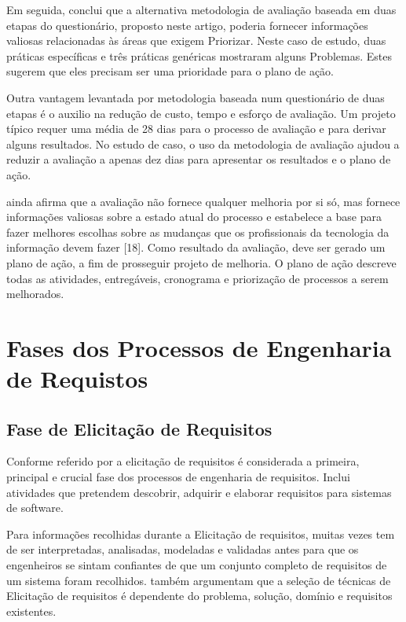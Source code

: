 Em seguida, \cite{cuevas2004assessment} conclui que a alternativa
metodologia de avaliação baseada em duas etapas do
questionário, proposto neste artigo, poderia fornecer
informações valiosas relacionadas às áreas que exigem
Priorizar. Neste caso de estudo, duas práticas específicas
e três práticas genéricas mostraram alguns
Problemas. Estes sugerem que eles precisam ser uma prioridade
para o plano de ação.

Outra vantagem levantada por \cite{cuevas2004assessment}
metodologia baseada num questionário de duas etapas é
o auxilio na redução de custo, tempo e esforço de avaliação. Um projeto típico requer uma média
de 28 dias para o processo de avaliação e para derivar alguns resultados. No estudo de caso, o uso da
metodologia de avaliação ajudou a reduzir a avaliação
a apenas dez dias para apresentar os resultados e o plano de ação.

\cite{cuevas2004assessment} ainda afirma que a avaliação não fornece qualquer melhoria
por si só, mas fornece informações valiosas sobre a
estado atual do processo e estabelece a base para
fazer melhores escolhas sobre as mudanças que
os profissionais da tecnologia da informação devem fazer [18].
Como resultado da avaliação, deve ser gerado um plano de ação, a fim de prosseguir
projeto de melhoria. O plano de ação descreve todas as
atividades, entregáveis, cronograma e priorização de
processos a serem melhorados.

\section{Fases dos Processos de Engenharia de Requistos}

\subsection{Fase de Elicitação de Requisitos}

Conforme referido por \cite{rafiq2017requirements} a elicitação de requisitos é considerada
a primeira, principal e crucial fase dos processos de engenharia de requisitos. Inclui atividades que pretendem descobrir,
adquirir e elaborar requisitos para sistemas de software.

Para \cite{rafiq2017requirements} informações recolhidas durante a Elicitação de requisitos, muitas vezes tem de ser interpretadas, analisadas, modeladas e validadas antes para que os engenheiros se sintam confiantes de que um conjunto completo de requisitos de um sistema foram recolhidos.\cite{rafiq2017requirements} também argumentam que a seleção de técnicas de Elicitação de requisitos é dependente do problema, solução, domínio e requisitos existentes.

